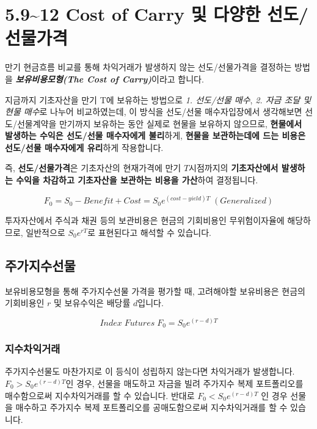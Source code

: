 \documentclass[
  letterpaper,
  DIV=11,
  numbers=noendperiod]{scrreprt}
\begin{document}
\section*{5.9\textasciitilde12 Cost of Carry 및 다양한
선도/선물가격}\label{sec-costofcarry}


만기 현금흐름 비교를 통해 차익거래가 발생하지 않는 선도/선물가격을
결정하는 방법을 \textbf{\emph{보유비용모형(The Cost of Carry)}}이라고
합니다.

지금까지 기초자산을 만기 T에 보유하는 방법으로 \emph{1. 선도/선물 매수},
\emph{2. 자금 조달 및 현물 매수}로 나누어 비교하였는데, 이 방식을
선도/선물 매수자입장에서 생각해보면 선도/선물계약을 만기까지 보유하는
동안 실제로 현물을 보유하지 않으므로, \textbf{현물에서 발생하는 수익은
선도/선물 매수자에게 불리}하게, \textbf{현물을 보관하는데에 드는 비용은
선도/선물 매수자에게 유리}하게 작용합니다.

즉, \textbf{선도/선물가격}은 기초자산의 현재가격에 만기 \(T\)시점까지의
\textbf{기초자산에서 발생하는 수익을 차감하고 기초자산을 보관하는 비용을
가산}하여 결정됩니다.

\[F_0=S_0-Benefit+Cost=S_0e^{(cost-yield)T}\;(Generalized)\]

투자자산에서 주식과 채권 등의 보관비용은 현금의 기회비용인
무위험이자율에 해당하므로, 일반적으로 \(S_0e^{rT}\)로 표현된다고 해석할
수 있습니다.

\subsection*{주가지수선물}\label{uxc8fcuxac00uxc9c0uxc218uxc120uxbb3c-1}

보유비용모형을 통해 주가지수선물 가격을 평가할 때, 고려해야할 보유비용은
현금의 기회비용인 \(r\) 및 보유수익은 배당률 \(d\)입니다.

\[Index\;Futures\;F_0=S_0e^{(r-d)T}\]

\subsubsection*{지수차익거래}\label{uxc9c0uxc218uxcc28uxc775uxac70uxb798}

주가지수선물도 마찬가지로 이 등식이 성립하지 않는다면 차익거래가
발생합니다. \(F_0>S_0e^{(r-d)T}\)인 경우, 선물을 매도하고 자금을 빌려
주가지수 복제 포트폴리오를 매수함으로써 지수차익거래를 할 수 있습니다.
반대로 \(F_0<S_0e^{(r-d)T}\) 인 경우 선물을 매수하고 주가지수 복제
포트폴리오를 공매도함으로써 지수차익거래를 할 수 있습니다.
\end{document}
